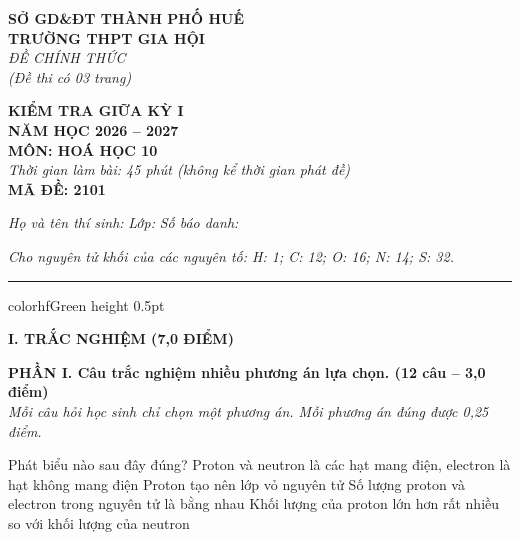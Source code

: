 \documentclass[11pt,a4paper]{article}
\begin{document}
\begin{minipage}[t]{0.48\textwidth}
\textbf{SỞ GD\&ĐT THÀNH PHỐ HUẾ}\\
\textbf{TRƯỜNG THPT GIA HỘI}\\
\textit{ĐỀ CHÍNH THỨC}\\
\textit{(Đề thi có 03 trang)}
\end{minipage}
\hfill
\begin{minipage}[t]{0.48\textwidth}
\raggedleft
\textbf{\color{hfRed}KIỂM TRA GIỮA KỲ I}\\
\textbf{NĂM HỌC 2026 -- 2027}\\
\textbf{MÔN: HOÁ HỌC 10}\\
\textit{Thời gian làm bài: 45 phút (không kể thời gian phát đề)}\\
\textbf{MÃ ĐỀ: 2101}
\end{minipage}

\vspace{4pt}
\noindent
\textit{Họ và tên thí sinh:} \dotfill \textit{Lớp:} \dotfill \textit{Số báo danh:} \dotfill

\vspace{3pt}
\noindent
\textit{\footnotesize Cho nguyên tử khối của các nguyên tố: H: 1; C: 12; O: 16; N: 14; S: 32.}

\vspace{3pt}
\hrule color{hfGreen} height 0.5pt

\vspace{4pt}
\noindent
{\color{mainGreen}\textbf{\Large I. TRẮC NGHIỆM (7,0 ĐIỂM)}}

\vspace{3pt}
\noindent
{\color{mainGreen}\textbf{\large PHẦN I. Câu trắc nghiệm nhiều phương án lựa chọn. (12 câu -- 3,0 điểm)}}\\
\textit{\small Mỗi câu hỏi học sinh chỉ chọn một phương án. Mỗi phương án đúng được 0,25 điểm.}
\vspace{2pt}

\begin{ex}
Phát biểu nào sau đây đúng?
\choice
{Proton và neutron là các hạt mang điện, electron là hạt không mang điện}
{Proton tạo nên lớp vỏ nguyên tử}
{\True Số lượng proton và electron trong nguyên tử là bằng nhau}
{Khối lượng của proton lớn hơn rất nhiều so với khối lượng của neutron}
\end{ex}
\end{document}
